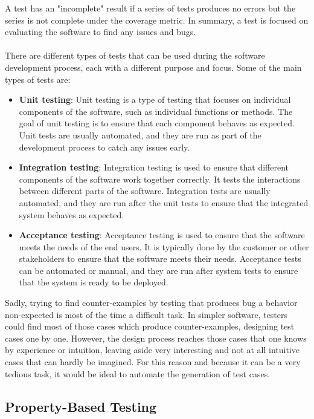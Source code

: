 \documentclass{report}
\begin{document}
A test has an "incomplete" result if a series of tests produces no errors but the series is not complete under the coverage metric. In summary, a test is focused on evaluating the software to find any issues and bugs.\\\\
There are different types of tests that can be used during the software development process, each with a different purpose and focus. Some of the main types of tests are:
\begin{itemize}
    \item \textbf{Unit testing}: Unit testing is a type of testing that focuses on individual components of the software, such as individual functions or methods. The goal of unit testing is to ensure that each component behaves as expected. Unit tests are usually automated, and they are run as part of the development process to catch any issues early.
    \item \textbf{Integration testing}: Integration testing is used to ensure that different components of the software work together correctly. It tests the interactions between different parts of the software. Integration tests are usually automated, and they are run after the unit tests to ensure that the integrated system behaves as expected.
    \item \textbf{Acceptance testing}: Acceptance testing is used to ensure that the software meets the needs of the end users. It is typically done by the customer or other stakeholders to ensure that the software meets their needs. Acceptance tests can be automated or manual, and they are run after system tests to ensure that the system is ready to be deployed.
\end{itemize}
Sadly, trying to find counter-examples by testing that produces bug a behavior non-expected is most of the time a difficult task. In simpler software, testers could find most of those cases which produce counter-examples, designing test cases one by one. However, the design process reaches those cases that one knows by experience or intuition, leaving aside very interesting and not at all intuitive cases that can hardly be imagined. For this reason and because it can be a very tedious task, it would be ideal to automate the generation of test cases.

\subsection{Property-Based Testing}
\end{document}
